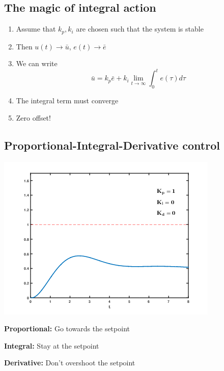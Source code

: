 \documentclass[
  letterpaper,
  DIV=11,
  numbers=noendperiod,
  oneside]{scrartcl}
\providecommand{\tightlist}{%
  \setlength{\itemsep}{0pt}\setlength{\parskip}{0pt}}\usepackage{longtable,booktabs,array}
\begin{document}
\subsection{The magic of integral
action}\label{the-magic-of-integral-action}

\begin{enumerate}
\def\labelenumi{\arabic{enumi}.}
\tightlist
\item
  Assume that \(k_p, k_i\) are chosen such that the system is stable
\item
  Then \(u(t) \to \bar{u}\), \(e(t) \to \bar{e}\)
\item
  We can write
  \[ \bar{u} = k_p \bar{e} + k_i \lim_{t \to \infty} \int_{0}^{t} e(\tau) d \tau\]
\item
  The integral term must converge
\item
  Zero offset!
\end{enumerate}

\subsection{Proportional-Integral-Derivative
control}\label{proportional-integral-derivative-control}

\includegraphics{figs/PID_Compensation_Animated.gif}

\textbf{Proportional:} Go towards the setpoint

\textbf{Integral:} Stay at the setpoint

\textbf{Derivative:} Don't overshoot the setpoint

\end{document}
